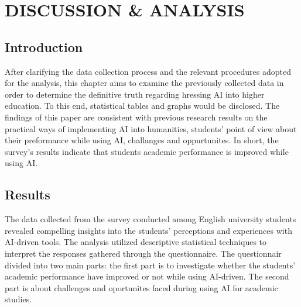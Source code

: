 \chapter{DISCUSSION \& ANALYSIS}
\section{Introduction}
After clarifying the data collection process and the relevant procedures adopted for
the analysis, this chapter aims to examine the previously collected data in order to determine
the definitive truth regarding hressing AI into higher education. To this end, statistical
tables and graphs would be disclosed. The findings of this
paper are consistent with previous research results on the practical ways of implementing AI into
humanities, students' point of view about their preformance while using AI, challanges and oppurtunites.
In short, the survey’s results indicate that students academic performance is improved while using AI.
\section{Results}
The data collected from the survey conducted among English university students
revealed compelling insights into the students' perceptions and experiences with AI-driven tools.
The analysis utilized descriptive statistical techniques to interpret the responses gathered through the questionnaire.
The questionnair divided into two main parts: the first part is to investigate
whether the students' academic performance have improved or not while using AI-driven. The second
part is about challenges and oportunites faced during using AI for academic studies.

